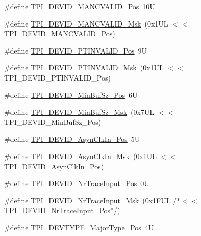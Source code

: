 \begin{DoxyCompactItemize}
\item 
\#define \hyperlink{group___c_m_s_i_s___t_p_i_ga675534579d9e25477bb38970e3ef973c}{T\+P\+I\+\_\+\+D\+E\+V\+I\+D\+\_\+\+M\+A\+N\+C\+V\+A\+L\+I\+D\+\_\+\+Pos}~10U
\item 
\#define \hyperlink{group___c_m_s_i_s___t_p_i_ga4c3ee4b1a34ad1960a6b2d6e7e0ff942}{T\+P\+I\+\_\+\+D\+E\+V\+I\+D\+\_\+\+M\+A\+N\+C\+V\+A\+L\+I\+D\+\_\+\+Msk}~(0x1\+U\+L $<$$<$ T\+P\+I\+\_\+\+D\+E\+V\+I\+D\+\_\+\+M\+A\+N\+C\+V\+A\+L\+I\+D\+\_\+\+Pos)
\item 
\#define \hyperlink{group___c_m_s_i_s___t_p_i_ga974cccf4c958b4a45cb71c7b5de39b7b}{T\+P\+I\+\_\+\+D\+E\+V\+I\+D\+\_\+\+P\+T\+I\+N\+V\+A\+L\+I\+D\+\_\+\+Pos}~9U
\item 
\#define \hyperlink{group___c_m_s_i_s___t_p_i_ga1ca84d62243e475836bba02516ba6b97}{T\+P\+I\+\_\+\+D\+E\+V\+I\+D\+\_\+\+P\+T\+I\+N\+V\+A\+L\+I\+D\+\_\+\+Msk}~(0x1\+U\+L $<$$<$ T\+P\+I\+\_\+\+D\+E\+V\+I\+D\+\_\+\+P\+T\+I\+N\+V\+A\+L\+I\+D\+\_\+\+Pos)
\item 
\#define \hyperlink{group___c_m_s_i_s___t_p_i_ga3f7da5de2a34be41a092e5eddd22ac4d}{T\+P\+I\+\_\+\+D\+E\+V\+I\+D\+\_\+\+Min\+Buf\+Sz\+\_\+\+Pos}~6U
\item 
\#define \hyperlink{group___c_m_s_i_s___t_p_i_ga939e068ff3f1a65b35187ab34a342cd8}{T\+P\+I\+\_\+\+D\+E\+V\+I\+D\+\_\+\+Min\+Buf\+Sz\+\_\+\+Msk}~(0x7\+U\+L $<$$<$ T\+P\+I\+\_\+\+D\+E\+V\+I\+D\+\_\+\+Min\+Buf\+Sz\+\_\+\+Pos)
\item 
\#define \hyperlink{group___c_m_s_i_s___t_p_i_gab382b1296b5efd057be606eb8f768df8}{T\+P\+I\+\_\+\+D\+E\+V\+I\+D\+\_\+\+Asyn\+Clk\+In\+\_\+\+Pos}~5U
\item 
\#define \hyperlink{group___c_m_s_i_s___t_p_i_gab67830557d2d10be882284275025a2d3}{T\+P\+I\+\_\+\+D\+E\+V\+I\+D\+\_\+\+Asyn\+Clk\+In\+\_\+\+Msk}~(0x1\+U\+L $<$$<$ T\+P\+I\+\_\+\+D\+E\+V\+I\+D\+\_\+\+Asyn\+Clk\+In\+\_\+\+Pos)
\item 
\#define \hyperlink{group___c_m_s_i_s___t_p_i_ga80ecae7fec479e80e583f545996868ed}{T\+P\+I\+\_\+\+D\+E\+V\+I\+D\+\_\+\+Nr\+Trace\+Input\+\_\+\+Pos}~0U
\item 
\#define \hyperlink{group___c_m_s_i_s___t_p_i_gabed454418d2140043cd65ec899abd97f}{T\+P\+I\+\_\+\+D\+E\+V\+I\+D\+\_\+\+Nr\+Trace\+Input\+\_\+\+Msk}~(0x1\+F\+U\+L /$\ast$$<$$<$ T\+P\+I\+\_\+\+D\+E\+V\+I\+D\+\_\+\+Nr\+Trace\+Input\+\_\+\+Pos$\ast$/)
\item 
\#define \hyperlink{group___c_m_s_i_s___t_p_i_ga69c4892d332755a9f64c1680497cebdd}{T\+P\+I\+\_\+\+D\+E\+V\+T\+Y\+P\+E\+\_\+\+Major\+Type\+\_\+\+Pos}~4U

\end{DoxyCompactItemize}
